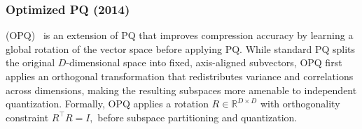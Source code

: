 \documentclass[sigconf]{acmart}
\begin{document}


\subsubsection{\textbf{Optimized PQ (2014)}}(OPQ)~\cite{opq} is an extension of PQ that improves compression accuracy by learning a global rotation of the vector space before applying PQ. 
While standard PQ splits the original $D$-dimensional space into fixed, axis-aligned subvectors, OPQ first applies an orthogonal transformation that redistributes variance and correlations across dimensions, making the resulting subspaces more amenable to independent quantization. 
Formally, OPQ applies a rotation $R \in \mathbb{R}^{D \times D}$ with orthogonality constraint
\(
R^\top R = I ,
\)
before subspace partitioning and quantization.
\end{document}
